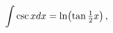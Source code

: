 \[\int\mathop{\csc\/}\nolimits xdx=\mathop{\ln\/}\nolimits\!\left(\mathop{\tan\/%
}\nolimits\tfrac{1}{2}x\right),\]